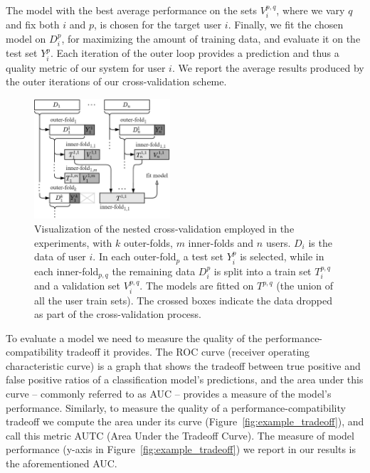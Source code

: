 \documentclass[letterpaper]{article} %
\theoremstyle{definition}
\begin{document}
The model with the best average performance on the sets $V_i^{p,q}$, where we vary $q$ and fix both $i$ and $p$, is chosen for the target user $i$.
Finally, we fit the chosen model on $D_i^p$, for maximizing the amount of training data, and evaluate it on the test set $Y_i^p$.
Each iteration of the outer loop provides a prediction and thus a quality metric of our system for user $i$.
We report the average results produced by the outer iterations of our cross-validation scheme.





\begin{figure}[t]
\centering
\includegraphics[width=0.45\textwidth]{cross_validation}
\caption{Visualization of the nested cross-validation employed in the experiments, with $k$ outer-folds, $m$ inner-folds and $n$ users. $D_i$ is the data of user $i$. In each outer-fold$_p$ a test set $Y_i^p$ is selected, while in each inner-fold$_{p,q}$ the remaining data $D_i^p$ is split into a train set $T_i^{p,q}$ and a validation set $V_i^{p,q}$. The models are fitted on $T^{p,q}$ (the union of all the user train sets). The crossed boxes indicate the data dropped as part of the cross-validation process.}
\label{fig:cross_validation}
\end{figure}

To evaluate a model we need to measure the quality of the performance-compatibility tradeoff it provides.
The  ROC curve (receiver operating characteristic curve) is a graph that shows the tradeoff between true positive and false positive ratios of a classification model's predictions, and the area under this curve -- commonly referred to as AUC -- provides a measure of the model's performance.
Similarly, to measure the quality of a performance-compatibility tradeoff we compute the  area under its curve (Figure~\ref{fig:example_tradeoff}), and call this metric AUTC (Area Under the Tradeoff Curve). The measure of model performance (y-axis in Figure~\ref{fig:example_tradeoff}) we report in our results is the aforementioned AUC.
\end{document}
